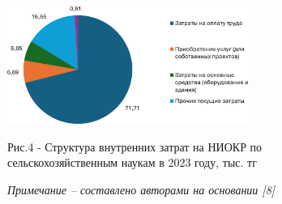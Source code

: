 \begin{figure}[H]
	\centering
	\includegraphics[width=0.7\textwidth]{media/ekon4/image6}
	\caption*{Рис.4 - Структура внутренних затрат на НИОКР по сельскохозяйственным наукам в 2023 году, тыс. тг}
	\caption*{\normalfont\emph{Примечание -- составлено авторами на основании {[}8{]}}}
\end{figure}

